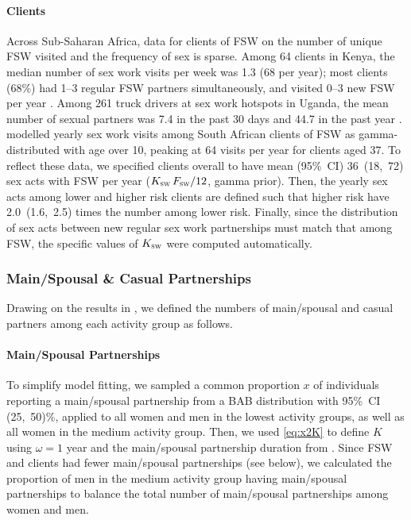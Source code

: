 \paragraph{Clients}
Across Sub-Saharan Africa, data for clients of FSW on
the number of unique FSW visited and the frequency of sex is sparse.
Among 64 clients in Kenya,
the median number of sex work visits per week was 1.3 (68 per year);
most clients (68\%) had 1--3 regular FSW partners simultaneously, and
visited 0--3 new FSW per year \cite{Voeten2002}.
Among 261 truck drivers at sex work hotspots in Uganda,
the mean number of sexual partners was
7.4 in the past 30 days and 44.7 in the past year \cite{Matovu2012}.
\citet{Johnson2017} modelled yearly sex work visits among South African clients of FSW as
gamma-distributed with age over 10, peaking at 64 visits per year for clients aged 37.
To reflect these data, we specified clients overall to have
mean (95\%~CI) 36~(18,~72) sex acts with FSW per year
($K_{\textsc{sw}}\,F_{\textsc{sw}}/12$, gamma prior).
Then, the yearly sex acts among lower and higher risk clients are defined such that
higher risk have 2.0~(1.6,~2.5) times the number among lower risk.
Finally, since the distribution of sex acts between new \vs regular sex work partnerships
must match that among FSW, the specific values of $K_{\textsc{sw}}$
were computed automatically.
\subsubsection{Main/Spousal \& Casual Partnerships}\label{mod.par.pnum.msc}
Drawing on the results in ,
we defined the numbers of main/spousal and casual partners
among each activity group as follows.
\paragraph{Main/Spousal Partnerships}
To simplify model fitting, we sampled a common proportion $x$ of
individuals reporting a main/spousal partnership from a BAB distribution with 95\%~CI (25,~50)\%,
applied to all women and men in the lowest activity groups,
as well as all women in the medium activity group.
Then, we used \eqref{eq:x2K} to define $K$ using $\omega = 1$ year and
the main/spousal partnership duration from .
Since FSW and clients had fewer main/spousal partnerships (see below),
we calculated the proportion of men in the medium activity group having main/spousal partnerships
to balance the total number of main/spousal partnerships among women and men.
